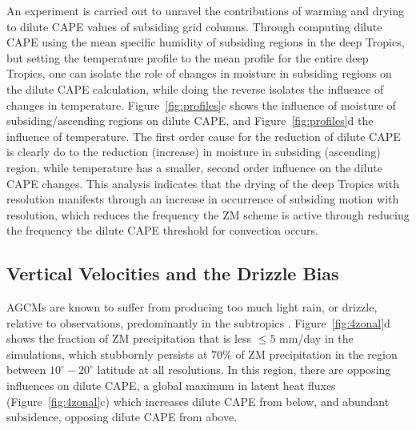 \documentclass[times]{qjrms4}
\begin{document}
An experiment is carried out to unravel the contributions of warming and drying to dilute CAPE values of subsiding grid columns. Through computing dilute CAPE using the mean specific humidity of subsiding regions in the deep Tropics, but setting the temperature profile to the mean profile for the entire deep Tropics, one can isolate the role of changes in moisture in subsiding regions on the dilute CAPE calculation, while doing the reverse isolates the influence of changes in temperature. Figure~\ref{fig:profiles}c shows the influence of moisture of subsiding/ascending regions on dilute CAPE, and Figure~\ref{fig:profiles}d the influence of temperature. The first order cause for the reduction of dilute CAPE is clearly do to the reduction (increase) in moisture in subsiding (ascending) region, while temperature has a smaller, second order influence on the dilute CAPE changes. This analysis indicates that the drying of the deep Tropics with resolution manifests through an increase in occurrence of subsiding motion with resolution, which reduces the frequency the ZM scheme is active through reducing the frequency the dilute CAPE threshold for convection occurs.

\subsection{Vertical Velocities and the Drizzle Bias}

AGCMs are known to suffer from producing too much light rain, or drizzle, relative to observations, predominantly in the subtropics \citep{D2006JCLIM}. Figure~\ref{fig:4zonal}d shows the fraction of ZM precipitation that is less $\leq 5$ mm/day in the simulations, which stubbornly persists at 70\% of ZM precipitation in the region between $10^{\circ}-20^{\circ}$ latitude at all resolutions. In this region, there are opposing influences on dilute CAPE, a global maximum in latent heat fluxes (Figure~\ref{fig:4zonal}c) which increases dilute CAPE from below, and abundant subsidence, opposing dilute CAPE from above.

\end{document}
